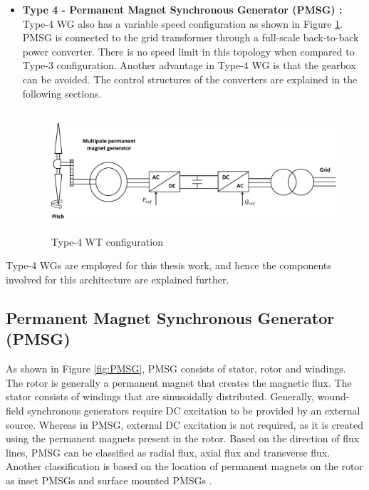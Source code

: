 \begin{itemize}
    \item \textbf{Type 4 - Permanent Magnet Synchronous Generator (PMSG) :} Type-4 \gls{WG} also has a variable speed configuration as shown in Figure \ref{fig:Type4}. \gls{PMSG} is connected to the grid transformer through a full-scale back-to-back power converter. There is no speed limit in this topology when compared to Type-3 configuration. Another advantage in Type-4 \gls{WG} is that the gearbox can be avoided. The control structures of the converters are explained in the following sections.
    
\begin{figure}[H]
\centering
    \includegraphics[height = 4.5cm,width = 13cm]{Diagrams/Chapter_2/Type4WT_new.pdf}
    \caption{Type-4 WT configuration \cite{ali_wind_2012}}
    \label{fig:Type4}
\end{figure}
\end{itemize}

Type-4 \gls{WG}s are employed for this thesis work, and hence the components involved for this architecture are explained further.

\subsection{Permanent Magnet Synchronous Generator (PMSG)}\label{PMSG}
As shown in Figure \ref{fig:PMSG}, \gls{PMSG} consists of stator, rotor and windings. The rotor is generally a permanent magnet that creates the magnetic flux. The stator consists of windings that are sinusoidally distributed. Generally, wound-field synchronous generators require \gls{DC} excitation to be provided by an external source. Whereas in \gls{PMSG}, external \gls{DC} excitation is not required, as it is created using the permanent magnets present in the rotor. Based on the direction of flux lines, \gls{PMSG} can be classified as radial flux, axial flux and transverse flux. Another classification is based on the location of permanent magnets on the rotor as inset \gls{PMSG}s and surface mounted \gls{PMSG}s \cite{sebastian_transient_1989}.  

